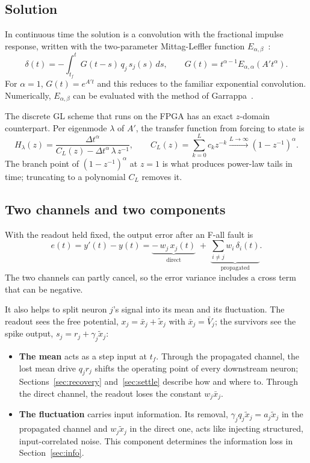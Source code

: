 \documentclass[11pt,a4paper]{article}
\newcommand{\xb}{\bar x}
\newcommand{\xtil}{\tilde x}
\begin{document}
\subsection{Solution}

In continuous time the solution is a convolution with the fractional impulse response, written with the two-parameter Mittag-Leffler function $E_{\alpha,\beta}$~\cite{podlubny1999}:
\begin{equation}
\delta(t) = -\int_{t_f}^{t} G(t-s)\, q_j\, s_j(s)\, ds, \qquad G(t) = t^{\alpha-1} E_{\alpha,\alpha}\!\left(A' t^{\alpha}\right).
\label{eq:conv}
\end{equation}
For $\alpha=1$, $G(t) = e^{A't}$ and this reduces to the familiar exponential convolution. Numerically, $E_{\alpha,\beta}$ can be evaluated with the method of Garrappa~\cite{garrappa2015}.

The discrete GL scheme that runs on the FPGA has an exact $z$-domain counterpart. Per eigenmode $\lambda$ of $A'$, the transfer function from forcing to state is
\begin{equation}
H_{\lambda}(z) = \frac{\Delta t^{\alpha}}{C_L(z) - \Delta t^{\alpha}\,\lambda\, z^{-1}}, \qquad C_L(z) = \sum_{k=0}^{L} c_k z^{-k} \xrightarrow{L\to\infty} (1 - z^{-1})^{\alpha}.
\label{eq:zdomain}
\end{equation}
The branch point of $(1-z^{-1})^{\alpha}$ at $z=1$ is what produces power-law tails in time; truncating to a polynomial $C_L$ removes it.

\subsection{Two channels and two components}

With the readout held fixed, the output error after an F-all fault is
\begin{equation}
e(t) = y'(t) - y(t) = \underbrace{-\,w_j\, x_j(t)}_{\text{direct}} \; + \; \underbrace{\textstyle\sum_{i \ne j} w_i\, \delta_i(t)}_{\text{propagated}}.
\label{eq:error}
\end{equation}
The two channels can partly cancel, so the error variance includes a cross term that can be negative.

It also helps to split neuron $j$'s signal into its mean and its fluctuation. The readout sees the free potential, $x_j = \xb_j + \xtil_j$ with $\xb_j = \bar V_j$; the survivors see the spike output, $s_j = r_j + \gamma_j \xtil_j$:
\begin{itemize}
  \item \textbf{The mean} acts as a step input at $t_f$. Through the propagated channel, the lost mean drive $q_j r_j$ shifts the operating point of every downstream neuron; Sections~\ref{sec:recovery} and~\ref{sec:settle} describe how and where to. Through the direct channel, the readout loses the constant $w_j \xb_j$.
  \item \textbf{The fluctuation} carries input information. Its removal, $\gamma_j q_j \xtil_j = a_j \xtil_j$ in the propagated channel and $w_j \xtil_j$ in the direct one, acts like injecting structured, input-correlated noise. This component determines the information loss in Section~\ref{sec:info}.
\end{itemize}
\end{document}
